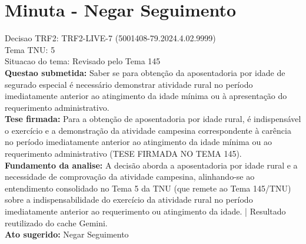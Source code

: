 \documentclass{article}
\begin{document}
\section*{Minuta - Negar Seguimento}
Decisao TRF2: TRF2-LIVE-7 (5001408-79.2024.4.02.9999)\\
Tema TNU: 5\\
Situacao do tema: Revisado pelo Tema 145\\
\textbf{Questao submetida:} Saber se para obtenção da aposentadoria por idade de segurado especial é necessário demonstrar atividade rural no período imediatamente anterior ao atingimento da idade mínima ou à apresentação do requerimento administrativo.\\
\textbf{Tese firmada:} Para a obtenção de aposentadoria por idade rural, é indispensável o exercício e a demonstração da atividade campesina correspondente à carência no período imediatamente anterior ao atingimento da idade mínima ou ao requerimento administrativo (TESE FIRMADA NO TEMA 145).\\
\textbf{Fundamento da analise:} A decisão aborda a aposentadoria por idade rural e a necessidade de comprovação da atividade campesina, alinhando-se ao entendimento consolidado no Tema 5 da TNU (que remete ao Tema 145/TNU) sobre a indispensabilidade do exercício da atividade rural no período imediatamente anterior ao requerimento ou atingimento da idade. | Resultado reutilizado do cache Gemini.\\
\textbf{Ato sugerido:} Negar Seguimento
\end{document}
